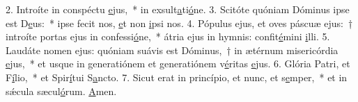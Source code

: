 2. Introíte in conspéctu \uline{e}jus,~* in exsult\uline{a}ti\uline{ó}ne.
3. Scitóte quóniam Dóminus ipse est D\uline{e}us:~* ipse fecit nos, \uline{e}t non \uline{i}psi nos.
4. Pópulus ejus, et oves páscuæ ejus:~† introíte portas ejus in confessi\uline{ó}ne,~* átria ejus in hymnis: confit\uline{é}mini \uline{i}lli.
5. Laudáte nomen ejus: quóniam suávis est Dóminus,~† in ætérnum misericórdia \uline{e}jus,~* et usque in generatiónem et generatiónem v\uline{é}ritas \uline{e}jus.
6. Glória Patri, et F\uline{í}lio,~* et Spir\uline{í}tui S\uline{a}ncto.
7. Sicut erat in princípio, et nunc, et s\uline{e}mper,~* et in sǽcula sæcul\uline{ó}rum. \uline{A}men.
